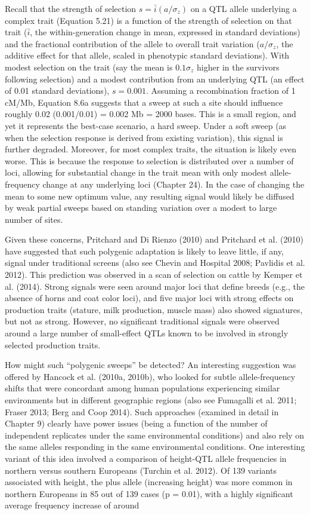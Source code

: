 \documentclass{article}
\begin{document}
Recall that the strength of selection $s=\bar{i}(a/\sigma_{z})$ on a QTL allele underlying a complex trait (Equation 5.21) is a function of the strength of selection on that trait ($\bar{i}$, the within-generation change in mean, expressed in standard deviations) and the fractional contribution of the allele to overall trait variation ($a/\sigma_{z}$, the additive effect for that allele, scaled in phenotypic standard deviations). With modest selection on the trait (say the mean is $0.1\sigma_{z}$ higher in the survivors following selection) and a modest contribution from an underlying QTL (an effect of 0.01 standard deviations), $s=0.001$. Assuming a recombination fraction of 1 cM/Mb, Equation 8.6a suggests that a sweep at such a site should influence roughly 0.02 (0.001/0.01) = 0.002 Mb = 2000 bases. This is a small region, and yet it represents the best-case scenario, a hard sweep. Under a soft sweep (as when the selection response is derived from existing variation), this signal is further degraded. Moreover, for most complex traits, the situation is likely even worse. This is because the response to selection is distributed over a number of loci, allowing for substantial change in the trait mean with only modest allele-frequency change at any underlying loci (Chapter 24). In the case of changing the mean to some new optimum value, any resulting signal would likely be diffused by weak partial sweeps based on standing variation over a modest to large number of sites.

Given these concerns, Pritchard and Di Rienzo (2010) and Pritchard et al. (2010) have suggested that such polygenic adaptation is likely to leave little, if any, signal under traditional screens (also see Chevin and Hospital 2008; Pavlidis et al. 2012). This prediction was observed in a scan of selection on cattle by Kemper et al. (2014). Strong signals were seen around major loci that define breeds (e.g., the absence of horns and coat color loci), and five major loci with strong effects on production traits (stature, milk production, muscle mass) also showed signatures, but not as strong. However, no significant traditional signals were observed around a large number of small-effect QTLs known to be involved in strongly selected production traits.

How might such “polygenic sweeps” be detected? An interesting suggestion was offered by Hancock et al. (2010a, 2010b), who looked for subtle allele-frequency shifts that were concordant among human populations experiencing similar environments but in different geographic regions (also see Fumagalli et al. 2011; Fraser 2013; Berg and Coop 2014). Such approaches (examined in detail in Chapter 9) clearly have power issues (being a function of the number of independent replicates under the same environmental conditions) and also rely on the same alleles responding in the same environmental conditions. One interesting variant of this idea involved a comparison of height-QTL allele frequencies in northern versus southern Europeans (Turchin et al. 2012). Of 139 variants associated with height, the plus allele (increasing height) was more common in northern Europeans in 85 out of 139 cases (p = 0.01), with a highly significant average frequency increase of around
\end{document}
